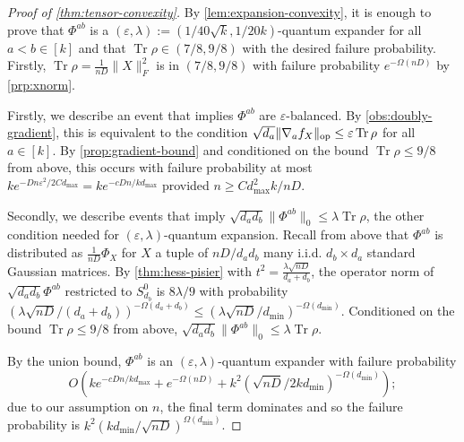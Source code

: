 \documentclass[aos]{imsart}
\newtheorem{corollary}[theorem]{Corollary}
\theoremstyle{definition}
\numberwithin{equation}{section}
\DeclareMathOperator{\op}{op}
\DeclareMathOperator{\tr}{Tr}
\DeclarePairedDelimiter{\norm}{\lVert}{\rVert}
\newcommand{\eps}{\varepsilon}
\newcommand{\Sym}{\mathcal{S}}
\newcommand{\smallSym}{S}
\newcommand{\rv}{X}
\begin{document}
\begin{proof}[Proof of \cref{thm:tensor-convexity}] By \cref{lem:expansion-convexity}, it is enough to prove that $\Phi^{ab}$ is a $(\eps, \lambda):=(1/40 \sqrt{ k}, 1/20k)$-quantum expander for all $a < b \in [k]$ and that $\tr \rho \in (7/8, 9/8)$ with the desired failure probability. Firstly, $\tr \rho = \frac{1}{nD} \|X\|_F^2$ is in $(7/8, 9/8)$ with failure probability $e^{ -\Omega(nD)} $ by \cref{prp:xnorm}. 

Firstly, we describe an event that implies $\Phi^{ab}$ are $\eps$-balanced. By \cref{obs:doubly-gradient}, this is equivalent to the condition $\sqrt{d_a} \norm{\nabla_a f_{\rv}}_{\op} \leq \eps \tr \rho$ for all $a \in [k]$. By \cref{prop:gradient-bound} and conditioned on the bound $\tr \rho \leq 9/8$ from above, this occurs with failure probability at most $k e^{-D n \eps^2/2Cd_{\max}} = k e^{ - c D n / k d_{\max}}$ provided $n \geq C  d_{\max}^2 k/n D$. 

Secondly, we describe events that imply $\sqrt{d_a d_b} \|\Phi^{ab}\|_0 \leq \lambda \tr \rho$, the other condition needed for $(\eps, \lambda)$-quantum expansion. Recall from above that $\Phi^{ab}$ is distributed as $\frac{1}{nD}\Phi_{X}$ for $X$ a tuple of $n D/d_a d_b$ many i.i.d. $d_b \times d_a $ standard Gaussian matrices. By \cref{thm:hess-pisier} with $t^2 = \frac {\lambda \sqrt{nD}}{d_a + d_b}$, the operator norm of $\sqrt{d_a d_b} \Phi^{ab}$ restricted to $\smallSym^0_{d_b}$ is $8\lambda/9$
with probability $(\lambda \sqrt{nD}/(d_a + d_b))^{ - \Omega(d_a + d_b)} \leq (\lambda \sqrt{nD} /d_{\min})^{ - \Omega(d_{\min})}$. Conditioned on the bound $\tr \rho \leq 9/8$ from above, $\sqrt{d_a d_b} \|\Phi^{ab}\|_0 \leq \lambda \tr \rho$.

By the union bound, $\Phi^{ab}$ is an $(\eps, \lambda)$-quantum expander with failure probability $$O\left(k e^{ - c D n / k d_{\max}} + e^{ -\Omega(nD)} + k^2 ( \sqrt{nD} /2k d_{\min})^{ - \Omega(d_{\min})}\right); $$
due to our assumption on $n$, the final term dominates and so the failure probability is $k^2 (  k d_{\min}/\sqrt{nD})^{\Omega(d_{\min})}$.
\end{proof}





 


\end{document}
